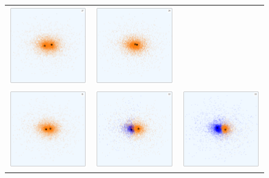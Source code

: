 \begin{figure}[!htbp]
{\begin{tabular}{|p{5.3cm}p{5.3cm}p{5.3cm}|}
    		{\includegraphics[width = 5.3cm]{images/jumper-demo/particleplot_00027.png}}	& 
            {\includegraphics[width = 5.3cm]{images/jumper-demo/particleplot_00028.png}}	\\[-0.5em] 
            {\includegraphics[width = 5.3cm]{images/jumper-demo/particleplot_00031.png}}    &
            {\includegraphics[width = 5.3cm]{images/jumper-demo/particleplot_00032.png}} 	&
            {\includegraphics[width = 5.3cm]{images/jumper-demo/particleplot_00033.png}} 	\\[-0.5em]

\end{tabular}}
\end{figure}
